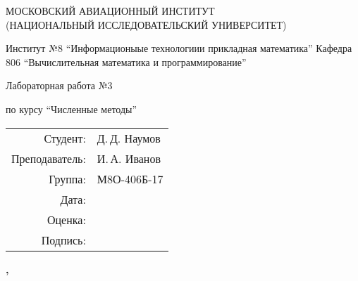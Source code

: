 \begin{titlepage}
\begin{spacing}{1.2}
\begin{center}
{\large 
МОСКОВСКИЙ АВИАЦИОННЫЙ ИНСТИТУТ\\ 
(НАЦИОНАЛЬНЫЙ ИССЛЕДОВАТЕЛЬСКИЙ УНИВЕРСИТЕТ)
}
\vspace{24pt}

{\large
Институт №8 \enquote{Информационыые технологиии прикладная математика}
}
{\large
Кафедра 806 \enquote{Вычислительная математика и программирование}
}
\vspace{96pt}

\bfseries
{\Large
Лабораторная работа №3

по курсу \enquote{Численные методы}
}

\end{center}

\vspace{72pt}

\begin{flushright}
\begin{tabular}{r l}
    \large Студент: & \large Д.\,Д. Наумов \\
    \large Преподаватель: & \large И.\,А. Иванов \\
    \large Группа: \large & М8О-406Б-17 \\
    \large Дата: & \\
    \large Оценка: & \\
    \large Подпись: & \\
\end{tabular}
\end{flushright}

\vfill

\begin{center}
\bfseries
{}, \the\year
\end{center}
\end{spacing}
\end{titlepage}

\pagebreak
